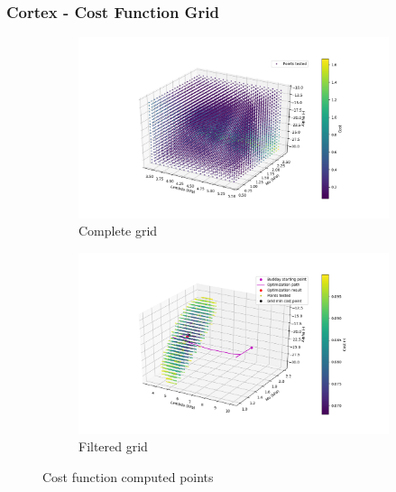 \documentclass{beamer}
\begin{document}
\begin{frame}
\frametitle{Cortex - Cost Function Grid}
\begin{figure}[h!]
\centering
\begin{subfigure}[t]{0.5\linewidth}
\centering
\includegraphics[width = 1.\linewidth, trim = 80 50 50 50]
{Pictures/CortexCompleteGrid}
\caption{Complete grid}
\end{subfigure}%
\begin{subfigure}[t]{0.5\linewidth}
\centering
\includegraphics[width = 1.\textwidth, trim = 50 50 80 50]
{Pictures/CortexFilteredGrid}
\caption{Filtered grid}
\end{subfigure}
\caption{Cost function computed points}
\end{figure}
\end{frame}
\end{document}

